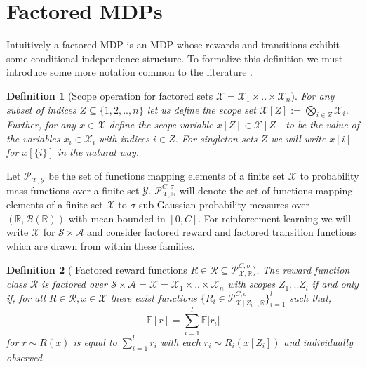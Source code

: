 \documentclass{article}
\newtheorem{mydef}{Definition}
\newcommand{\Exp}{\mathds{E}}
\newcommand{\Real}{\mathds{R}}
\newcommand{\Xc}{\mathcal{X}}
\newcommand{\Yc}{\mathcal{Y}}
\newcommand{\Pc}{\mathcal{P}}
\newcommand{\Rc}{\mathcal{R}}
\newcommand{\Sc}{\mathcal{S}}
\newcommand{\Ac}{\mathcal{A}}
\begin{document}
\section{Factored MDPs}

Intuitively a factored MDP is an MDP whose rewards and transitions exhibit some conditional independence structure.
To formalize this definition we must introduce some more notation common to the literature \cite{szita2009optimistic}.

\begin{mydef}[Scope operation for factored sets $\Xc = \Xc_1 \times .. \times \Xc_n$]
\hspace{0.000000001mm} \newline
For any subset of indices $Z \subseteq \{1,2,..,n\}$ let us define the scope set $\Xc[Z] := \bigotimes\limits_{i \in Z} \Xc_i$.
Further, for any $x \in \Xc$ define the scope variable $x[Z] \in \Xc[Z] $ to be the value of the variables $x_i \in \Xc_i$ with indices $i \in Z$.
For singleton sets $Z$ we will write $x[i]$ for $x[\{ i \}]$ in the natural way.
\end{mydef}


Let $\Pc_{\Xc,\Yc}$ be the set of functions mapping elements of a finite set $\Xc$ to probability mass functions over a finite set $\Yc$.
$\Pc^{C,\sigma}_{\Xc,\Real}$ will denote the set of functions mapping elements of a finite set $\Xc$ to $\sigma$-sub-Gaussian probability measures over $(\Real, \mathcal{B}(\Real))$ with mean bounded in $[0,C]$.
For reinforcement learning we will write $\Xc$ for $\Sc \times \Ac$ and consider factored reward and factored transition functions which are drawn from within these families.

\begin{mydef}[ Factored reward functions $R \in \Rc \subseteq \Pc^{C,\sigma}_{\Xc,\Real} $]
\hspace{0.000000001mm} \newline
The reward function class $\Rc$ is factored over $\Sc \times \Ac = \Xc = \Xc_1 \times .. \times \Xc_n $ with scopes $Z_1, .. Z_l$ if and only if,
for all $R \in \Rc, x \in \Xc$ there exist functions $\{R_i \in \Pc^{C,\sigma}_{\Xc [ Z_i] ,\Real} \}_{i=1}^l $ such that,
$$ \Exp [ r ] = \sum_{i=1}^l \Exp\big[ r_i \big] $$
for $r \sim R(x)$ is equal to $\sum_{i=1}^l r_i$ with each $r_i \sim R_i(x[Z_i])$ and individually observed.
\end{mydef}
\end{document}

